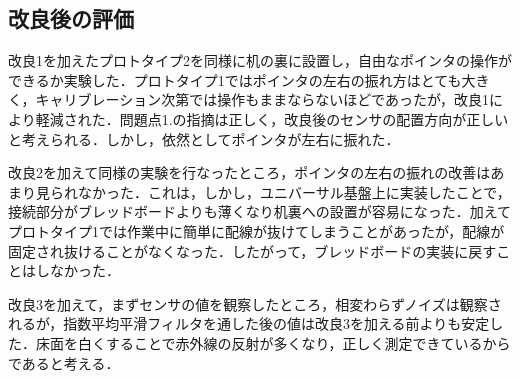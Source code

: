 \subsection{改良後の評価}
改良1を加えたプロトタイプ2を同様に机の裏に設置し，自由なポインタの操作ができるか実験した．プロトタイプ1ではポインタの左右の振れ方はとても大きく，キャリブレーション次第では操作もままならないほどであったが，改良1により軽減された．問題点1.の指摘は正しく，改良後のセンサの配置方向が正しいと考えられる．しかし，依然としてポインタが左右に振れた．
\par
改良2を加えて同様の実験を行なったところ，ポインタの左右の振れの改善はあまり見られなかった．これは，しかし，ユニバーサル基盤上に実装したことで，接続部分がブレッドボードよりも薄くなり机裏への設置が容易になった．加えてプロトタイプ1では作業中に簡単に配線が抜けてしまうことがあったが，配線が固定され抜けることがなくなった．したがって，ブレッドボードの実装に戻すことはしなかった．
\par
改良3を加えて，まずセンサの値を観察したところ，相変わらずノイズは観察されるが，指数平均平滑フィルタを通した後の値は改良3を加える前よりも安定した．床面を白くすることで赤外線の反射が多くなり，正しく測定できているからであると考える．

